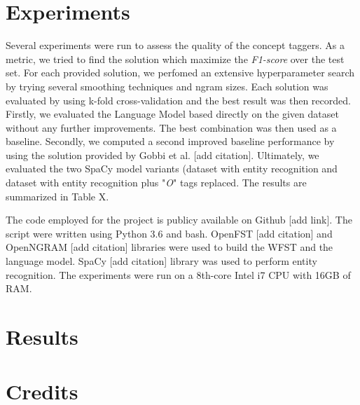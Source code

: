 \documentclass[11pt,a4paper]{article}
\begin{document}
\section{Experiments}

Several experiments were run to assess the quality of 
the concept taggers. As a metric, we tried to find the solution which maximize the \textit{F1-score} over the test set. For each provided solution, we perfomed an extensive hyperparameter search by trying several smoothing techniques and ngram sizes. Each solution was evaluated by using k-fold cross-validation and the best result was then recorded. Firstly, we evaluated the Language Model based directly on the given dataset without any further improvements. The best combination was then used as a baseline. Secondly, we computed a second improved baseline performance by using the solution provided by Gobbi et al. [add citation]. Ultimately, we evaluated the two SpaCy model variants (dataset with entity recognition and dataset with entity recognition plus "\textit{O}" tags replaced. The results are summarized in Table X.

The code employed for the project is publicy available on Github [add link]. The script were written using Python 3.6 and bash. OpenFST [add citation] and OpenNGRAM [add citation] libraries were used to build the WFST and the language model. SpaCy [add citation] library was used to perform entity recognition.
The experiments were run on a 8th-core Intel i7 CPU with 16GB of RAM. 

\section{Results}

\section{Credits}
\end{document}
